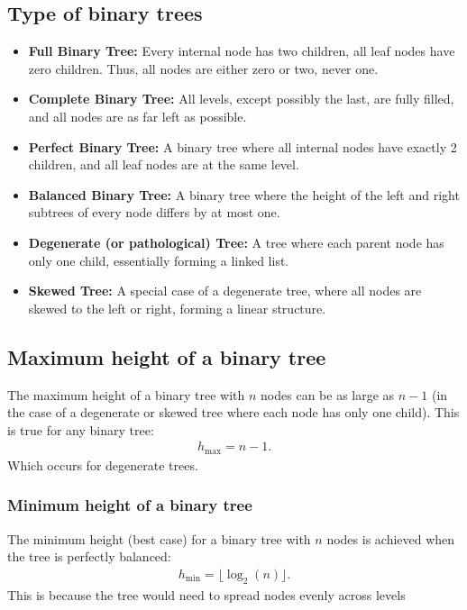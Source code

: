 \documentclass{report}
\begin{document}
\pagebreak 
\subsection{Type of binary trees}
\begin{itemize}
    \item \textbf{Full Binary Tree:} Every internal node has two children, all leaf nodes have zero children. Thus, all nodes are either zero or two, never one. 
    \item \textbf{Complete Binary Tree:} All levels, except possibly the last, are fully filled, and all nodes are as far left as possible.
    \item \textbf{Perfect Binary Tree:} A binary tree where all internal nodes have exactly 2 children, and all leaf nodes are at the same level.
    \item \textbf{Balanced Binary Tree:} A binary tree where the height of the left and right subtrees of every node differs by at most one.
    \item \textbf{Degenerate (or pathological) Tree:} A tree where each parent node has only one child, essentially forming a linked list.
    \item \textbf{Skewed Tree:} A special case of a degenerate tree, where all nodes are skewed to the left or right, forming a linear structure.
\end{itemize}

\pagebreak 
\subsection{Maximum height of a binary tree}
\bigbreak \noindent 
The maximum height of a binary tree with $n$ nodes can be as large as $n−1$ (in the case of a degenerate or skewed tree where each node has only one child). This is true for any binary tree:
\begin{align*}
    h_{\text{max}} = n - 1
.\end{align*}
\bigbreak \noindent 
Which occurs for degenerate trees.

\bigbreak \noindent 
\subsubsection{Minimum height of a binary tree}
\bigbreak \noindent 
The minimum height (best case) for a binary tree with $n$ nodes is achieved when the tree is perfectly balanced:
\begin{align*}
    h_{\text{min}} = \lfloor\log_{2}(n)\rfloor
.\end{align*}
\bigbreak \noindent 
This is because the tree would need to spread nodes evenly across levels
\end{document}
